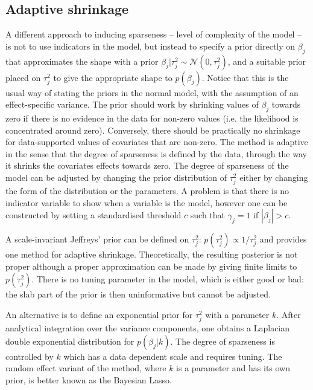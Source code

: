 \documentclass[11 pt]{article}
\begin{document}
\begin{multicols}{2}
\subsection{Adaptive shrinkage} 
A different approach to inducing sparseness -- level of complexity of the model -- is not to use indicators in the model, but instead to specify a prior directly on $\beta_j$ that approximates the  shape with a prior $\beta_j | \tau^2_j \sim \mathcal{N}(0, \tau^2_j )$, and a suitable prior placed on $\tau^2_j$ to give the appropriate shape to $p(\beta_j)$. Notice that this is the usual way of stating the priors in the normal model, with the assumption of an effect-specific variance. The prior should work by shrinking values of $\beta_j$ towards zero if there is no evidence in the data for non-zero values (i.e. the likelihood is concentrated around zero). Conversely, there should be practically no shrinkage for data-supported values of covariates that are non-zero. The method is adaptive in the sense that the degree of sparseness is defined by the data, through the way it shrinks the covariates effects towards zero. The degree of sparseness of the model can be adjusted by changing the prior distribution of $\tau^2_j$ either by changing the form of the distribution or the parameters. A problem is that there is no indicator variable to show when a variable is  the model, however one can be constructed by setting a standardised threshold $c$ such that $\gamma_j = 1$ if $|\beta_j| > c$.

A scale-invariant Jeffreys’ prior can be defined on $\tau^2_j$: $p(\tau^2_j) \propto 1/\tau^2_j$ and provides one method
for adaptive shrinkage. Theoretically, the resulting posterior is not proper although a proper approximation can be made by giving finite limits to $p(\tau^2_j)$. There is no tuning parameter in the model, which is either good or bad: the slab part of the prior is then uninformative but cannot be adjusted.

An alternative is to define an exponential prior for $\tau^2_j$ with a parameter $k$. After analytical integration over the variance components, one obtains a Laplacian double exponential distribution for $p(\beta_j | k)$. The degree of sparseness is controlled by $k$ which has a data dependent scale and requires tuning. The random effect variant of the method, where $k$ is a parameter and has its own prior, is better known as the Bayesian Lasso.
 

\end{multicols}
\end{document}
